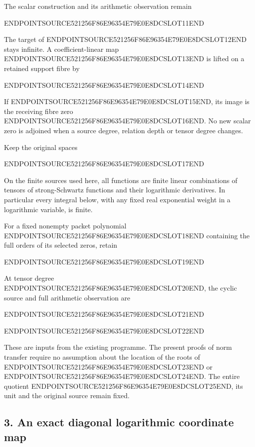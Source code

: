 The scalar construction and its arithmetic observation remain

ENDPOINTSOURCE521256F86E96354E79E0E8DCSLOT11END

The target of ENDPOINTSOURCE521256F86E96354E79E0E8DCSLOT12END stays infinite. A coefficient-linear map ENDPOINTSOURCE521256F86E96354E79E0E8DCSLOT13END is lifted on a retained support fibre by

ENDPOINTSOURCE521256F86E96354E79E0E8DCSLOT14END

If ENDPOINTSOURCE521256F86E96354E79E0E8DCSLOT15END, its image is the receiving fibre zero ENDPOINTSOURCE521256F86E96354E79E0E8DCSLOT16END. No new scalar zero is adjoined when a source degree, relation depth or tensor degree changes.

Keep the original spaces

ENDPOINTSOURCE521256F86E96354E79E0E8DCSLOT17END

On the finite sources used here, all functions are finite linear combinations of tensors of strong-Schwartz functions and their logarithmic derivatives. In particular every integral below, with any fixed real exponential weight in a logarithmic variable, is finite.

For a fixed nonempty packet polynomial ENDPOINTSOURCE521256F86E96354E79E0E8DCSLOT18END containing the full orders of its selected zeros, retain

ENDPOINTSOURCE521256F86E96354E79E0E8DCSLOT19END

At tensor degree ENDPOINTSOURCE521256F86E96354E79E0E8DCSLOT20END, the cyclic source and full arithmetic observation are

ENDPOINTSOURCE521256F86E96354E79E0E8DCSLOT21END

ENDPOINTSOURCE521256F86E96354E79E0E8DCSLOT22END

These are inputs from the existing programme. The present proofs of norm transfer require no assumption about the location of the roots of ENDPOINTSOURCE521256F86E96354E79E0E8DCSLOT23END or ENDPOINTSOURCE521256F86E96354E79E0E8DCSLOT24END. The entire quotient ENDPOINTSOURCE521256F86E96354E79E0E8DCSLOT25END, its unit and the original source remain fixed.

\subsection{3. An exact diagonal logarithmic coordinate map}\label{endpoint-periodized_original--an-exact-diagonal-logarithmic-coordinate-map}

